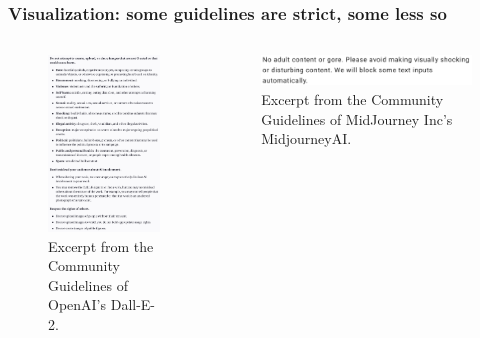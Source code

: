 \documentclass[
	11pt, compress%
]{beamer}
\begin{document}
\begin{frame}
	\frametitle{Visualization: some guidelines are strict, some less so}
	\begin{columns}[c] 
		\begin{column}{0.5\textwidth} %
			\begin{figure}
				\includegraphics[width=0.63\linewidth]{Images/CommunityGuidelinesDALLE2.png}
				\caption{\tiny Excerpt from the Community Guidelines of OpenAI's Dall-E-2\cite{DallETOS}.}
			\end{figure}
		\end{column}
		\begin{column}{0.5\textwidth} %
			\begin{figure}
				\includegraphics[width=0.67\linewidth]{Images/CommunityGuidelinesMidjourneyAI2.png}
				\caption{\tiny Excerpt from the Community  Guidelines of MidJourney Inc's MidjourneyAI\cite{MidJourneyTOS}.} 
			\end{figure}
		\end{column}
	\end{columns}
\end{frame}
\end{document}
